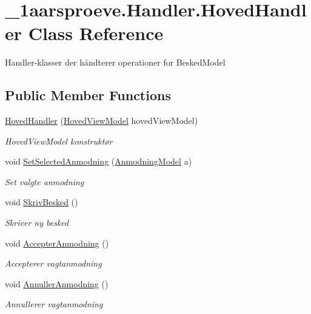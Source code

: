 \hypertarget{class__1aarsproeve_1_1_handler_1_1_hoved_handler}{}\section{\+\_\+1aarsproeve.\+Handler.\+Hoved\+Handler Class Reference}
\label{class__1aarsproeve_1_1_handler_1_1_hoved_handler}


Handler-\/klasser der håndterer operationer for Besked\+Model  


\subsection*{Public Member Functions}
\begin{DoxyCompactItemize}
\item 
\hyperlink{class__1aarsproeve_1_1_handler_1_1_hoved_handler_ad0d900d482d4780d1a75a91eea9b5a4f}{Hoved\+Handler} (\hyperlink{class__1aarsproeve_1_1_view_model_1_1_hoved_view_model}{Hoved\+View\+Model} hoved\+View\+Model)
\begin{DoxyCompactList}\small\item\em Hoved\+View\+Model konstruktør \end{DoxyCompactList}\item 
void \hyperlink{class__1aarsproeve_1_1_handler_1_1_hoved_handler_a98de2a70d06c32b84d5045982bc992c6}{Set\+Selected\+Anmodning} (\hyperlink{class__1aarsproeve_1_1_model_1_1_anmodning_model}{Anmodning\+Model} a)
\begin{DoxyCompactList}\small\item\em Set valgte anmodning \end{DoxyCompactList}\item 
void \hyperlink{class__1aarsproeve_1_1_handler_1_1_hoved_handler_a8b177c4c354c1657f3de1a240ce63334}{Skriv\+Besked} ()
\begin{DoxyCompactList}\small\item\em Skriver ny besked \end{DoxyCompactList}\item 
void \hyperlink{class__1aarsproeve_1_1_handler_1_1_hoved_handler_af90ba2f90c6afced39ca748444372b52}{Accepter\+Anmodning} ()
\begin{DoxyCompactList}\small\item\em Accepterer vagtanmodning \end{DoxyCompactList}\item 
void \hyperlink{class__1aarsproeve_1_1_handler_1_1_hoved_handler_ae5f4c08bb6f8435e9ae08bab1dc2f69e}{Annuller\+Anmodning} ()
\begin{DoxyCompactList}\small\item\em Annullerer vagtanmodning \end{DoxyCompactList}\end{DoxyCompactItemize}
